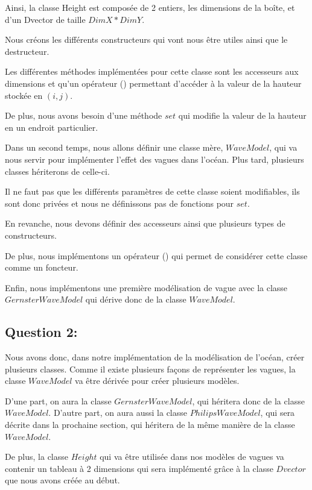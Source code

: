 \documentclass{article}
\begin{document}
Ainsi, la classe Height est composée de 2 entiers, les dimensions de la boîte, et d'un Dvector de taille $DimX * DimY$.

Nous créons les différents constructeurs qui vont nous être utiles ainsi que le destructeur.

Les différentes méthodes implémentées pour cette classe sont les accesseurs aux dimensions et qu'un opérateur () permettant d'accéder à la valeur de la hauteur stockée en $(i,j)$.

De plus, nous avons besoin d'une méthode $set$ qui modifie la valeur de la hauteur en un endroit particulier.

Dans un second temps,  nous allons définir une classe mère, $WaveModel$, qui va nous servir pour implémenter l'effet des vagues dans l'océan. Plus tard, plusieurs classes hériterons de celle-ci.

Il ne faut pas que les différents paramètres de cette classe soient modifiables, ils sont donc privées et nous ne définissons pas de fonctions pour $set$.

En revanche, nous devons définir des accesseurs ainsi que plusieurs types de constructeurs.

De plus, nous implémentons un opérateur () qui permet de considérer cette classe comme un foncteur.

Enfin, nous implémentons une première modélisation de vague avec la classe $GernsterWaveModel$ qui dérive donc de la classe $WaveModel$.

\vspace{0.5cm}

\subsection{Question 2:}

Nous avons donc, dans notre implémentation de la modélisation de l'océan, créer plusieurs classes. Comme il existe plusieurs façons de représenter les vagues, la classe $WaveModel$ va être dérivée pour créer plusieurs modèles.

D'une part, on aura la classe $GernsterWaveModel$, qui héritera donc de la classe $WaveModel$. D'autre part, on aura aussi la classe $PhilipsWaveModel$, qui sera décrite dans la prochaine section, qui héritera de la même manière de la classe $WaveModel$.

De plus, la classe $Height$ qui va être utilisée dans nos modèles de vagues va contenir un tableau à 2 dimensions qui sera implémenté grâce à la classe $Dvector$ que nous avons créée au début.
\end{document}
